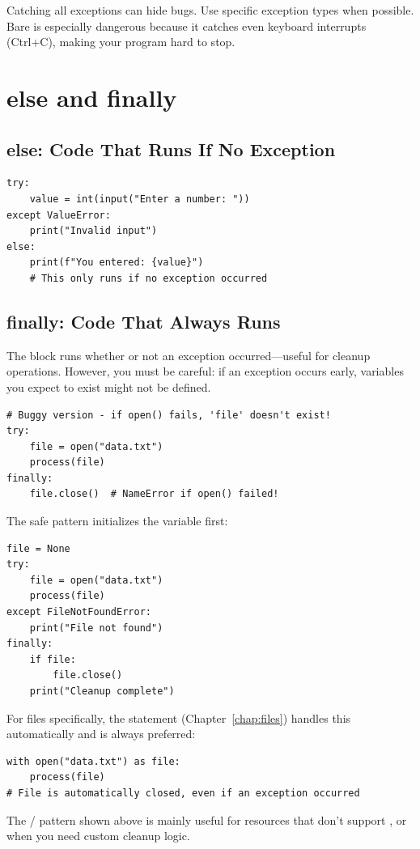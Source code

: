 \begin{warning}
Catching all exceptions can hide bugs. Use specific exception types when possible. Bare  is especially dangerous because it catches even keyboard interrupts (Ctrl+C), making your program hard to stop.
\end{warning}

\section{else and finally}
\label{sec:else-finally}

\subsection{else: Code That Runs If No Exception}

\begin{lstlisting}
try:
    value = int(input("Enter a number: "))
except ValueError:
    print("Invalid input")
else:
    print(f"You entered: {value}")
    # This only runs if no exception occurred
\end{lstlisting}

\subsection{finally: Code That Always Runs}

The  block runs whether or not an exception occurred---useful for cleanup operations. However, you must be careful: if an exception occurs early, variables you expect to exist might not be defined.

\begin{lstlisting}
# Buggy version - if open() fails, 'file' doesn't exist!
try:
    file = open("data.txt")
    process(file)
finally:
    file.close()  # NameError if open() failed!
\end{lstlisting}

The safe pattern initializes the variable first:

\begin{lstlisting}
file = None
try:
    file = open("data.txt")
    process(file)
except FileNotFoundError:
    print("File not found")
finally:
    if file:
        file.close()
    print("Cleanup complete")
\end{lstlisting}

\begin{tip}
For files specifically, the  statement (Chapter~\ref{chap:files}) handles this automatically and is always preferred:
\begin{lstlisting}
with open("data.txt") as file:
    process(file)
# File is automatically closed, even if an exception occurred
\end{lstlisting}
The / pattern shown above is mainly useful for resources that don't support , or when you need custom cleanup logic.
\end{tip}


